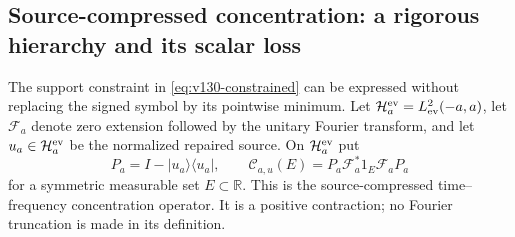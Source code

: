 \documentclass[11pt]{article}
\theoremstyle{remark}
\begin{document}
\subsection*{Source-compressed concentration: a rigorous hierarchy and its scalar loss}

The support constraint in \eqref{eq:v130-constrained} can be expressed
without replacing the signed symbol by its pointwise minimum.  Let
$\mathcal H_a^{\rm ev}=L^2_{\rm ev}(-a,a)$, let $\mathcal F_a$ denote
zero extension followed by the unitary Fourier transform, and let
$u_a\in\mathcal H_a^{\rm ev}$ be the normalized repaired source.  On
$\mathcal H_a^{\rm ev}$ put
\[
 P_a=I-|u_a\rangle\langle u_a|,
 \qquad
 \mathcal C_{a,u}(E)
 =P_a\mathcal F_a^*1_E\mathcal F_aP_a
\]
for a symmetric measurable set $E\subset\mathbb R$.  This is the
source-compressed time--frequency concentration operator.  It is a
positive contraction; no Fourier truncation is made in its definition.
\end{document}
